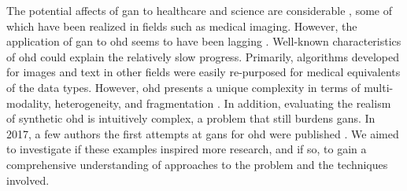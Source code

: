         The potential affects of \gls{gan} to healthcare and science are considerable \cite{Rankin2020}, some of which have been realized in fields such as medical imaging. However, the application of \gls{gan} to \gls{ohd} seems to have been lagging \cite{Xiao_2018_chall}. Well-known characteristics of \gls{ohd} could explain the relatively slow progress. Primarily, algorithms developed for images and text in other fields were easily re-purposed for medical equivalents of the data types. However, \gls{ohd} presents a unique complexity in terms of multi-modality, heterogeneity, and fragmentation \cite{Xiao_2018_chall}. In addition, evaluating the realism of synthetic \gls{ohd} is intuitively complex, a problem that still burdens \glspl{gan}. In 2017, a few authors the first attempts at \glspl{gan} for \gls{ohd} were published \cite{esteban2017real,Che_2017,Choi2017-nt,yahi2017generative}. We aimed to investigate if these examples inspired more research, and if so, to gain a comprehensive understanding of approaches to the problem and the techniques involved.